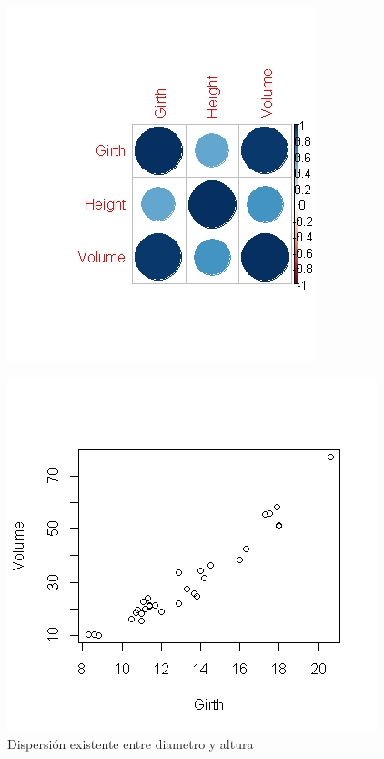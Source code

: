 \documentclass[12pt,a4paper]{article}
\begin{document}
\begin{figure}
\centering
\includegraphics[scale=0.9]{cor}
\caption{}
\label{fig:cor}
\end{figure}

\begin{figure}
\centering
\includegraphics[scale=0.9]{disp1}
\caption{Dispersión existente entre diametro y altura}
\label{fig:disp1}
\end{figure}
\end{document}
